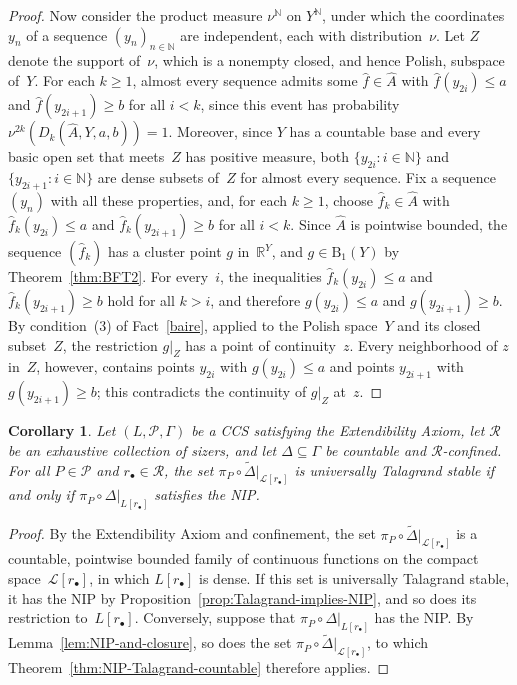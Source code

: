 \documentclass[psamsfonts]{amsart}
\newtheorem{cor}[thm]{Corollary}
\theoremstyle{definition}
\theoremstyle{remark}
\numberwithin{equation}{section}
\begin{document}
\begin{proof}
Now consider the product measure $\nu^{\mathbb{N}}$ on $Y^{\mathbb{N}}$, under which the coordinates $y_n$ of a sequence $(y_n)_{n\in\mathbb{N}}$ are independent, each with distribution~$\nu$.
Let $Z$ denote the support of~$\nu$, which is a nonempty closed, and hence Polish, subspace of~$Y$.
For each $k\ge1$, almost every sequence admits some $\hat f\in\hat A$ with $\hat f(y_{2i})\le a$ and $\hat f(y_{2i+1})\ge b$ for all $i<k$, since this event has probability $\nu^{2k}(D_k(\hat A,Y,a,b))=1$.
Moreover, since $Y$ has a countable base and every basic open set that meets~$Z$ has positive measure, both $\{y_{2i}:i\in\mathbb{N}\}$ and $\{y_{2i+1}:i\in\mathbb{N}\}$ are dense subsets of~$Z$ for almost every sequence.
Fix a sequence $(y_n)$ with all these properties, and, for each $k\ge1$, choose $\hat f_k\in\hat A$ with $\hat f_k(y_{2i})\le a$ and $\hat f_k(y_{2i+1})\ge b$ for all $i<k$.
Since $\hat A$ is pointwise bounded, the sequence $(\hat f_k)$ has a cluster point $g$ in~$\mathbb{R}^Y$, and $g\in\mathrm{B}_1(Y)$ by Theorem~\ref{thm:BFT2}.
For every~$i$, the inequalities $\hat f_k(y_{2i})\le a$ and $\hat f_k(y_{2i+1})\ge b$ hold for all $k>i$, and therefore $g(y_{2i})\le a$ and $g(y_{2i+1})\ge b$.
By condition~(3) of Fact~\ref{baire}, applied to the Polish space~$Y$ and its closed subset~$Z$, the restriction $g|_Z$ has a point of continuity~$z$.
Every neighborhood of $z$ in~$Z$, however, contains points $y_{2i}$ with $g(y_{2i})\le a$ and points $y_{2i+1}$ with $g(y_{2i+1})\ge b$; this contradicts the continuity of $g|_Z$ at~$z$.
\end{proof}

\begin{cor}\label{cor:NIP-Talagrand-computations}
Let $(L,\mathcal{P},\Gamma)$ be a CCS satisfying the Extendibility Axiom, let $\mathscr{R}$ be an exhaustive collection of sizers, and let $\Delta\subseteq\Gamma$ be countable and $\mathscr{R}$-confined.
For all $P\in\mathcal{P}$ and $r_\bullet\in\mathscr{R}$, the set $\pi_P\circ\tilde\Delta|_{\mathcal{L}[r_\bullet]}$ is universally Talagrand stable if and only if $\pi_P\circ\Delta|_{L[r_\bullet]}$ satisfies the NIP.
\end{cor}

\begin{proof}
By the Extendibility Axiom and confinement, the set $\pi_P\circ\tilde\Delta|_{\mathcal{L}[r_\bullet]}$ is a countable, pointwise bounded family of continuous functions on the compact space~$\mathcal{L}[r_\bullet]$, in which $L[r_\bullet]$ is dense.
If this set is universally Talagrand stable, it has the NIP by Proposition~\ref{prop:Talagrand-implies-NIP}, and so does its restriction to~$L[r_\bullet]$.
Conversely, suppose that $\pi_P\circ\Delta|_{L[r_\bullet]}$ has the NIP.
By Lemma~\ref{lem:NIP-and-closure}, so does the set $\pi_P\circ\tilde\Delta|_{\mathcal{L}[r_\bullet]}$, to which Theorem~\ref{thm:NIP-Talagrand-countable} therefore applies.
\end{proof}
\end{document}
